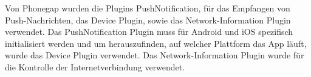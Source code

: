 Von Phonegap wurden die Plugins PushNotification, für das Empfangen von Push-Nachrichten, das Device Plugin, sowie das Network-Information Plugin verwendet. Das PushNotification Plugin muss für Android und iOS spezifisch initialisiert werden und um herauszufinden, auf welcher Plattform das App läuft, wurde das Device Plugin verwendet. Das Network-Information Plugin wurde für die Kontrolle der Internetverbindung verwendet.\\



